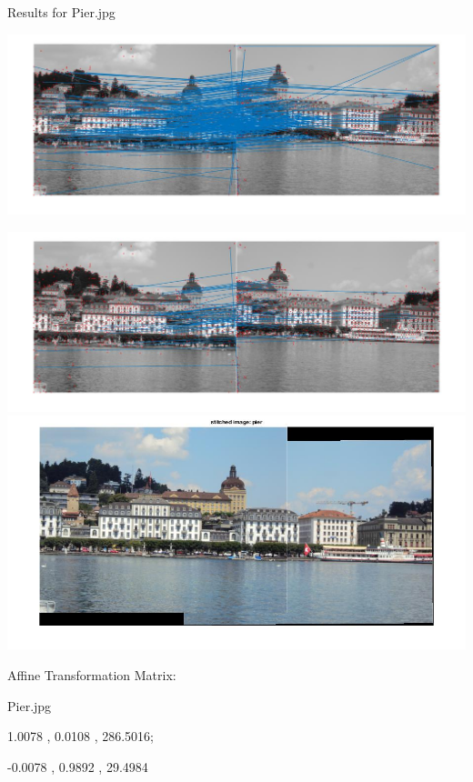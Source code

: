 \documentclass[fleqn]{article}
\begin{document}
\newpage


Results for Pier.jpg
\begin{center}
\includegraphics[width=1.2\textwidth]{pier1.jpg}

\includegraphics[width=1.2\textwidth]{pier2.jpg}
\newline
\includegraphics[width=1.2\textwidth]{pier3.jpg}

Affine Transformation Matrix:
\vspace{10 mm}

Pier.jpg

1.0078   ,   0.0108    ,    286.5016;

-0.0078  ,   0.9892    ,    29.4984

\end{center}

\newpage
\end{document}
